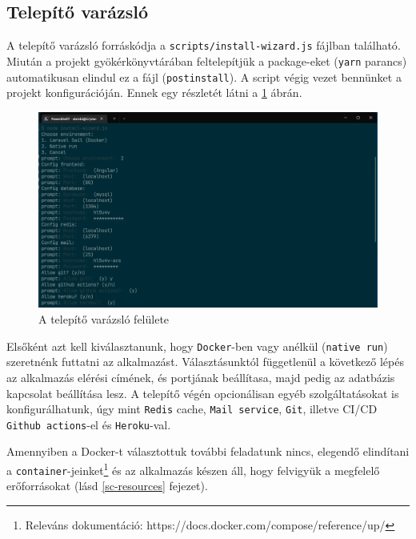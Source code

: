 \documentclass[a4paper,12pt]{thesis-ekf}
\theoremstyle{definition}
\begin{document}
		\subsection{Telepítő varázsló}\label{ssc-install-wizard}
		A telepítő varázsló forráskódja a \verb|scripts/install-wizard.js| fájlban található\cite{install-wizard-js}. Miután a projekt gyökérkönyvtárában feltelepítjük a package-eket (\verb|yarn| parancs\cite{yarn}) automatikusan elindul ez a fájl (\verb|postinstall|). A script végig vezet bennünket a projekt konfigurációján. Ennek egy részletét látni a \ref{fig-install-wizard} ábrán.
		
		\begin{figure}[ht]
        	\centering
        	\includegraphics[width=1\textwidth]{images/install-wizard.png}
        	\caption{A telep\'it\H{o} var\'azsl\'o fel\"ulete}
        	\label{fig-install-wizard}
        \end{figure}
		
		Elsőként azt kell kiválasztanunk, hogy \verb|Docker|-ben vagy anélkül (\verb|native run|) szeretnénk futtatni az alkalmazást. Választásunktól függetlenül a következő lépés az alkalmazás elérési címének, és portjának beállítasa, majd pedig az adatbázis kapcsolat beállítása lesz. A telepítő végén opcionálisan egyéb szolgáltatásokat is konfigurálhatunk, úgy mint \verb|Redis| cache, \verb|Mail service|\cite{laravel-mail}, \verb|Git|, illetve CI/CD \verb|Github actions|\cite{gh-actions}-el és \verb|Heroku|-val.
		
		Amennyiben a Docker-t választottuk további feladatunk nincs, elegendő elindítani a \verb|container|-jeinket\footnote{Releváns dokumentáció: https://docs.docker.com/compose/reference/up/} és az alkalmazás készen áll, hogy felvigyük a megfelelő erőforrásokat (lásd \ref{sc-resources} fejezet).
		
\end{document}
